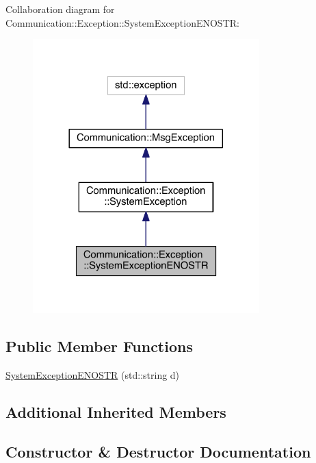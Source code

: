 Collaboration diagram for Communication\+:\+:Exception\+:\+:System\+Exception\+E\+N\+O\+S\+T\+R\+:\nopagebreak
\begin{figure}[H]
\begin{center}
\leavevmode
\includegraphics[width=248pt]{class_communication_1_1_exception_1_1_system_exception_e_n_o_s_t_r__coll__graph}
\end{center}
\end{figure}
\subsection*{Public Member Functions}
\begin{DoxyCompactItemize}
\item 
\hyperlink{class_communication_1_1_exception_1_1_system_exception_e_n_o_s_t_r_a163b561c14fa60c0489769b0f236937f}{System\+Exception\+E\+N\+O\+S\+T\+R} (std\+::string d)
\end{DoxyCompactItemize}
\subsection*{Additional Inherited Members}


\subsection{Constructor \& Destructor Documentation}
\hypertarget{class_communication_1_1_exception_1_1_system_exception_e_n_o_s_t_r_a163b561c14fa60c0489769b0f236937f}{}
